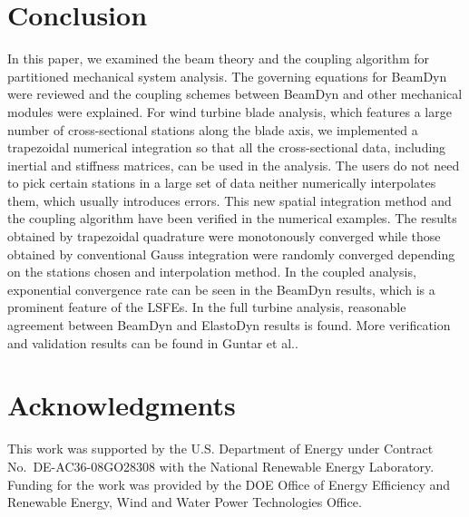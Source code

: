\documentclass{aiaa-tc}
\begin{document}
\section{Conclusion}

In this paper, we examined the beam theory and the coupling algorithm for partitioned mechanical system analysis. The governing equations for BeamDyn were reviewed and the coupling schemes between BeamDyn and other mechanical modules were explained. For wind turbine blade analysis, which features a large number of cross-sectional stations along the blade axis, we implemented a trapezoidal numerical integration so that all the cross-sectional data, including inertial and stiffness matrices, can be used in the analysis. The users do not need to pick certain stations in a large set of data neither numerically interpolates them, which usually introduces errors. This new spatial integration method and the coupling algorithm have been verified in the numerical examples. The results obtained by trapezoidal quadrature were monotonously converged while those obtained by conventional Gauss integration were randomly converged depending on the stations chosen and interpolation method. In the coupled analysis, exponential convergence rate can be seen in the BeamDyn results, which is a prominent feature of the LSFEs. In the full turbine analysis, reasonable agreement between BeamDyn and ElastoDyn results is found. More verification and validation results can be found in Guntar et al.\cite{Sri:SciTech2016}.
  
\section*{Acknowledgments} 

This work was supported by the U.S. Department of Energy under Contract No.\
DE-AC36-08GO28308 with the National Renewable Energy Laboratory. Funding for the work was provided by the DOE Office of Energy Efficiency and Renewable Energy, Wind and Water Power Technologies Office.   



\end{document}
